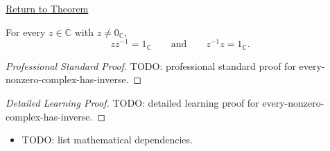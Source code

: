 \newpage
{}
\label{prf:every-nonzero-complex-has-inverse}

\begin{remark*}[Return]
\hyperref[thm:every-nonzero-complex-has-inverse]{Return to Theorem}
\end{remark*}

\begin{theorem*}
For every \(z\in\mathbb{C}\) with \(z\ne 0_{\mathbb{C}}\),
\[
zz^{-1}=1_{\mathbb{C}}
\qquad\text{and}\qquad
z^{-1}z=1_{\mathbb{C}}.
\]
\end{theorem*}

\begin{proof}[Professional Standard Proof]
\LRAProofBodyStart
TODO: professional standard proof for every-nonzero-complex-has-inverse.
\end{proof}

\begin{proof}[Detailed Learning Proof]
\LRAProofBodyStart
TODO: detailed learning proof for every-nonzero-complex-has-inverse.
\end{proof}

\begin{remark*}
\end{remark*}

\begin{dependencies}
\begin{itemize}
  \item TODO: list mathematical dependencies.
\end{itemize}
\end{dependencies}

\clearpage
